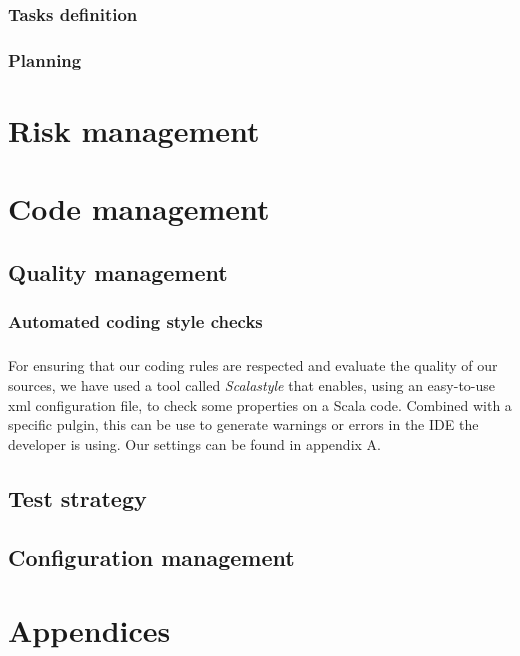 \documentclass{report}
\begin{document}
\subsection{Tasks definition}

\subsection{Planning}


\chapter{Risk management}


\chapter{Code management}

\section{Quality management}

\subsection{Automated coding style checks}

\paragraph{}
\hspace{4mm}\textnormal{For ensuring that our coding rules are respected and evaluate the quality of our sources, we have
used a tool called \textit{Scalastyle} that enables, using an easy-to-use xml configuration file, to check
some properties on a Scala code. Combined with a specific pulgin, this can be use to generate warnings or errors
in the IDE the developer is using. Our settings can be found in appendix A.}

\section{Test strategy}

\paragraph{}
\hspace{4mm}\textnormal{}

\section{Configuration management}

\paragraph{}
\hspace{4mm}\textnormal{}

\chapter{Appendices}
\end{document}
